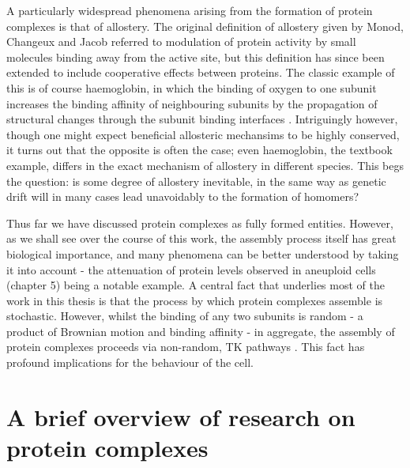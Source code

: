 \documentclass[a4paper,11pt,twoside,openright]{scrbook}
\let\cite\supercite
\begin{document}
A particularly widespread phenomena arising from the formation of protein complexes is that of allostery. The original definition of allostery given by Monod, Changeux and Jacob \cite{Monod1963} referred to modulation of protein activity by small molecules binding away from the active site, but this definition has since been extended to include cooperative effects between proteins. The classic example of this is of course haemoglobin, in which the binding of oxygen to one subunit increases the binding affinity of neighbouring subunits by the propagation of structural changes through the subunit binding interfaces \cite{Perutz1976}. Intriguingly however, though one might expect beneficial allosteric mechansims to be highly conserved, it turns out that the opposite is often the case; even haemoglobin, the textbook example, differs in the exact mechanism of allostery in different species. This begs the question: is some degree of allostery inevitable, in the same way as genetic drift will in many cases lead unavoidably to the formation of homomers?

Thus far we have discussed protein complexes as fully formed entities. However, as we shall see over the course of this work, the assembly process itself has great biological importance, and many phenomena can be better understood by taking it into account - the attenuation of protein levels observed in aneuploid cells (chapter 5) being a notable example. A central fact that underlies most of the work in this thesis is that the process by which protein complexes assemble is stochastic. However, whilst the binding of any two subunits is random - a product of Brownian motion and binding affinity - in aggregate, the assembly of protein complexes proceeds via non-random, TK pathways \cite{Levy2008a, Marsh2013, Macek2017}. This fact has profound implications for the behaviour of the cell.

\section{A brief overview of research on protein complexes}
\end{document}
